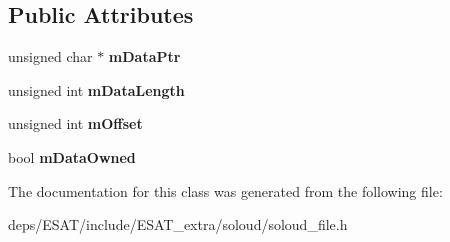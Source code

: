 \subsection*{Public Attributes}
\begin{DoxyCompactItemize}
\item 
\mbox{\label{class_so_loud_1_1_memory_file_aff89e6baa16c1ca90c97aa3dbd3d20f9}} 
unsigned char $\ast$ {\bfseries m\+Data\+Ptr}
\item 
\mbox{\label{class_so_loud_1_1_memory_file_ab407b1a28480fb1e7526f4fbaaeeafd0}} 
unsigned int {\bfseries m\+Data\+Length}
\item 
\mbox{\label{class_so_loud_1_1_memory_file_a20c583c361b6564bea362c6a9a1e7682}} 
unsigned int {\bfseries m\+Offset}
\item 
\mbox{\label{class_so_loud_1_1_memory_file_a2ee4bfc90fa42f79f78f3663c446b6db}} 
bool {\bfseries m\+Data\+Owned}
\end{DoxyCompactItemize}


The documentation for this class was generated from the following file\+:\begin{DoxyCompactItemize}
\item 
deps/\+E\+S\+A\+T/include/\+E\+S\+A\+T\+\_\+extra/soloud/soloud\+\_\+file.\+h\end{DoxyCompactItemize}
